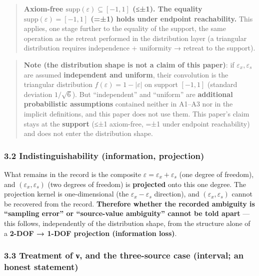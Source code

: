 \documentclass[
]{ltjsarticle}
\begin{document}
\begin{quote}
\textbf{Axiom-free \(\mathrm{supp}(\varepsilon)\subseteq[-1,1]\) (≤±1).
The equality \(\mathrm{supp}(\varepsilon)=[-1,1]\) (=±1) holds under
endpoint reachability.} This applies, one stage further to the equality
of the support, the same operation as the retreat performed in the
distribution layer (a triangular distribution requires independence +
uniformity → retreat to the support).
\end{quote}

\begin{quote}
\textbf{Note (the distribution shape is not a claim of this paper)}: if
\(\varepsilon_x,\varepsilon_s\) are assumed \textbf{independent and
uniform}, their convolution is the triangular distribution
\(f(\varepsilon)=1-|\varepsilon|\) on support \([-1,1]\) (standard
deviation \(1/\sqrt6\)). But ``independent'' and ``uniform'' are
\textbf{additional probabilistic assumptions} contained neither in
A1--A3 nor in the implicit definitions, and this paper does not use
them. This paper's claim stays at the \textbf{support} (≤±1 axiom-free,
=±1 under endpoint reachability) and does not enter the distribution
shape.
\end{quote}

\subsubsection{3.2 Indistinguishability (information,
projection)}\label{indistinguishability-information-projection}

What remains in the record is the composite
\(\varepsilon=\varepsilon_x+\varepsilon_s\) (one degree of freedom), and
\((\varepsilon_x,\varepsilon_s)\) (two degrees of freedom) is
\textbf{projected} onto this one degree. The projection kernel is
one-dimensional (the \(\varepsilon_x-\varepsilon_s\) direction), and
\((\varepsilon_x,\varepsilon_s)\) cannot be recovered from the record.
\textbf{Therefore whether the recorded ambiguity is ``sampling error''
or ``source-value ambiguity'' cannot be told apart} --- this follows,
independently of the distribution shape, from the structure alone of a
\textbf{2-DOF → 1-DOF projection (information loss)}.

\subsubsection{3.3 Treatment of ν, and the three-source case (interval;
an honest
statement)}\label{treatment-of-ux3bd-and-the-three-source-case-interval-an-honest-statement}
\end{document}
